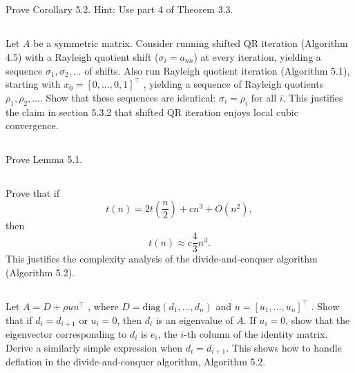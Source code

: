 \documentclass[a4paper]{ctexart}
\newcommand{\pf}{\textbf{\color{pink}{proof:}}}
\begin{document}
\pf

\subsection{}
Prove Corollary 5.2. Hint: Use part 4 of Theorem 3.3.

\pf

\subsection{}
Let $A$ be a symmetric matrix. Consider running
shifted QR iteration (Algorithm 4.5) with a Rayleigh quotient shift ($\sigma_i = a_{nn}$)
at every iteration, yielding a sequence $\sigma_1, \sigma_2, \ldots$ of shifts. Also run Rayleigh
quotient iteration (Algorithm 5.1), starting with $x_0 = [0, \ldots, 0, 1]^\top$ , yielding
a sequence of Rayleigh quotients $\rho_1, \rho_2, \ldots$. Show that these sequences are
identical: $\sigma_i = \rho_i$ for all $i$. This justifies the claim in section 5.3.2 that shifted
QR iteration enjoys local cubic convergence.

\pf

\subsection{}
Prove Lemma 5.1.

\pf

\subsection{}
Prove that if 
\begin{equation*}
    t(n) = 2t(\frac{n}{2}) + cn^3 + O(n^2),
\end{equation*} 
then
\begin{equation*}
    t(n) \approx c\frac{4}{3}n^3.
\end{equation*} This justifies the complexity analysis of the divide-and-conquer
algorithm (Algorithm 5.2).

\pf

\subsection{}
Let $A = D + \rho uu^\top$ , where $D = \text{diag}(d_1, \ldots , d_n)$ and
$u = [u_1, \ldots , u_n]^\top$ . Show that if $d_i = d_{i+1}$ or $u_i = 0$, then $d_i$ is an eigenvalue
of $A$. If $u_i = 0$, show that the eigenvector corresponding to $d_i$ is $e_i$, the
$i$-th column of the identity matrix. Derive a similarly simple expression when
$d_i = d_{i+1}$. This shows how to handle deflation in the divide-and-conquer
algorithm, Algorithm 5.2.
\end{document}
